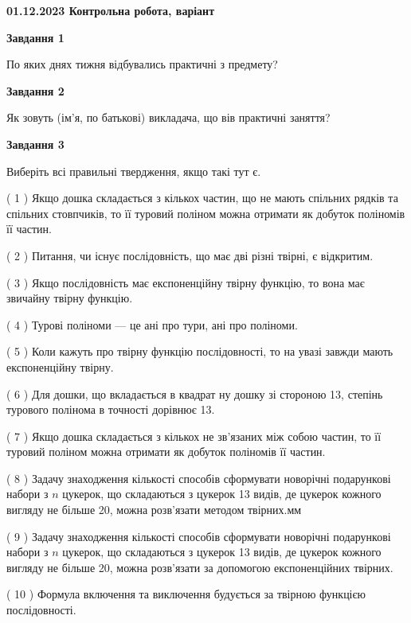 \documentclass[12pt, ukrainian]{article}
\begin{document}
\begin {large}

\textbf{01.12.2023 Контрольна робота, варіант  }\par


{
{\begin {center}\textbf{Завдання 1}\end {center}}\par
По яких днях тижня відбувались практичні з предмету?\par
{\begin {center}\textbf{Завдання 2}\end {center}}\par
Як зовуть (ім'я, по батькові) викладача, що вів практичні заняття?\par
{\begin {center}\textbf{Завдання 3}\end {center}}\par
Виберіть всі правильні твердження, якщо такі тут є.\par
\vspace{2mm}
( 1 ) Якщо дошка складається з кількох частин, що не мають спільних рядків та спільних стовпчиків, то її туровий поліном можна отримати як добуток поліномів її частин.%

( 2 ) Питання, чи існує послідовність, що має дві різні твірні, є відкритим.%

( 3 ) Якщо послідовність має експоненційну твірну функцію, то вона має звичайну твірну функцію.%

( 4 ) Турові поліноми --- це ані про тури, ані про поліноми.%

( 5 ) Коли кажуть про твірну функцію послідовності, то на увазі завжди мають експоненційну твірну.%

( 6 ) Для дошки, що вкладається в квадрат ну дошку зі стороною 13, степінь турового полінома в точності дорівнює 13.%

( 7 ) Якщо дошка складається з кількох не зв’язаних між собою частин, то її туровий поліном можна отримати як добуток поліномів її частин.%

( 8 ) Задачу знаходження кількості способів сформувати новорічні подарункові набори з $n$ цукерок, що складаються з цукерок 13 видів, де цукерок кожного вигляду не більше 20, можна розв’язати методом твірних.мм%

( 9 ) Задачу знаходження кількості способів сформувати новорічні подарункові набори з $n$ цукерок, що складаються з цукерок 13 видів, де цукерок кожного вигляду не більше 20, можна розв’язати за допомогою експоненційних твірних.%

( 10 ) Формула включення та виключення будується за твірною функцією послідовності.%
}
\end {large}

\vspace{4mm}
\newpage
\end{document}
